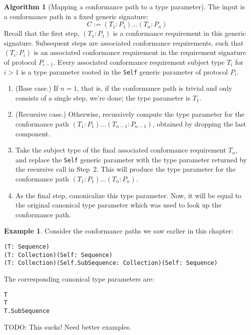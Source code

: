 \documentclass[a4paper,headsepline,bibliography=totoc,toc=flat,fleqn,twoside=semi]{scrbook}
\theoremstyle{definition}
\theoremstyle{definition}
\newtheorem{example}{Example}[chapter]
\theoremstyle{definition}
\newtheorem{algorithm}{Algorithm}[chapter]
\begin{document}
\begin{algorithm}[Mapping a conformance path to a type parameter]\label{invertconformancepath}
The input is a conformance path in a fixed generic signature:
\[C := (T_1: P_1)\ldots (T_n: P_n)\]
Recall that the first step, $(T_1: P_1)$ is a conformance requirement in this generic signature. Subsequent steps are associated conformance requirements, such that $(T_i: P_i)$ is an associated conformance requirement in the requirement signature of protocol $P_{i-1}$. Every associated conformance requirement subject type $T_i$ for $i>1$ is a type parameter rooted in the \texttt{Self} generic parameter of protocol $P_i$.
\begin{enumerate}
\item (Base case.) If $n=1$, that is, if the conformance path is trivial and only consists of a single step, we're done; the type parameter is $T_1$.

\item (Recursive case.) Otherwise, recursively compute the type parameter for the conformance path $(T_1: P_1)\ldots (T_{n-1}: P_{n-1})$, obtained by dropping the last component.

\item Take the subject type of the final associated conformance requirement $T_n$, and replace the \texttt{Self} generic parameter with the type parameter returned by the recursive call in Step~2. This will produce the type parameter for the conformance path $(T_1: P_1)\ldots (T_n: P_n)$. 

\item As the final step, canonicalize this type parameter. Now, it will be equal to the original canonical type parameter which was used to look up the conformance path.
\end{enumerate}
\end{algorithm}

\begin{example}
Consider the conformance paths we saw earlier in this chapter:
\begin{verbatim}
(T: Sequence)
(T: Collection)(Self: Sequence)
(T: Collection)(Self.SubSequence: Collection)(Self: Sequence)
\end{verbatim}
The corresponding canonical type parameters are:
\begin{verbatim}
T
T
T.SubSequence
\end{verbatim}

TODO: This sucks! Need better examples.
\end{example}
\end{document}
